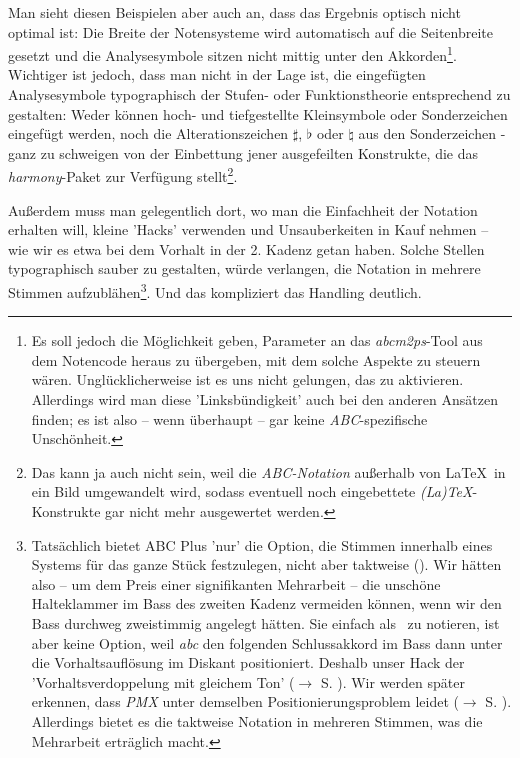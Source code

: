 Man sieht diesen Beispielen aber auch an, dass das Ergebnis optisch nicht
optimal ist: Die Breite der Notensysteme wird automatisch auf die Seitenbreite
gesetzt und die Analysesymbole sitzen nicht mittig unter den
Akkorden\footnote{Es soll jedoch die Möglichkeit geben, Parameter an das
\emph{abcm2ps}-Tool aus dem Notencode heraus zu übergeben, mit dem solche
Aspekte zu steuern wären. Unglücklicherweise ist es uns nicht gelungen, das zu
aktivieren. Allerdings wird man diese 'Linksbündigkeit' auch bei den anderen
Ansätzen finden; es ist also -- wenn überhaupt -- gar keine
\emph{ABC}-spezifische Unschönheit.}. \label{AppraisalABC}Wichtiger ist jedoch,
dass man nicht in der Lage ist, die eingefügten Analysesymbole typographisch der
Stufen- oder Funktionstheorie entsprechend zu gestalten: Weder können hoch- und
tiefgestellte Kleinsymbole oder Sonderzeichen eingefügt werden, noch die
Alterationszeichen $\sharp$, $\flat$ oder $\natural$ aus den Sonderzeichen -
ganz zu schweigen von der Einbettung jener ausgefeilten Konstrukte, die das
\emph{harmony}-Paket zur Verfügung stellt\footnote{Das kann ja auch nicht sein,
weil die \emph{ABC-Notation} außerhalb von \LaTeX\ in ein Bild umgewandelt wird,
sodass eventuell noch eingebettete \emph{(La)\TeX}-Konstrukte gar nicht mehr
ausgewertet werden.}.

Außerdem muss man gelegentlich dort, wo man die Einfachheit der Notation
erhalten will, kleine 'Hacks' verwenden und Unsauberkeiten in Kauf nehmen -- wie
wir es etwa bei dem Vorhalt in der 2. Kadenz getan haben. Solche Stellen
typographisch sauber zu gestalten, würde verlangen, die Notation in mehrere
Stimmen aufzublähen\footnote{Tatsächlich bietet ABC Plus 'nur' die Option, die
Stimmen innerhalb eines Systems für das ganze Stück festzulegen, nicht aber
taktweise (\cite[vgl.][49f]{Gonzato2018b}). Wir hätten also -- um dem Preis einer
signifikanten Mehrarbeit -- die unschöne Halteklammer im Bass des zweiten Kadenz
vermeiden können, wenn wir den Bass durchweg zweistimmig angelegt hätten. Sie
einfach als \Halb\ zu notieren, ist aber keine Option, weil \emph{abc} den
folgenden Schlussakkord im Bass dann unter die Vorhaltsauflösung im Diskant
positioniert. Deshalb unser Hack der 'Vorhaltsverdoppelung mit gleichem Ton'
($\rightarrow$ S. ). Wir werden später erkennen, dass
\emph{PMX} unter demselben Positionierungsproblem leidet ($\rightarrow$ S.
). Allerdings bietet es die taktweise Notation in
mehreren Stimmen, was die Mehrarbeit erträglich macht.
}. Und das kompliziert das Handling deutlich.

